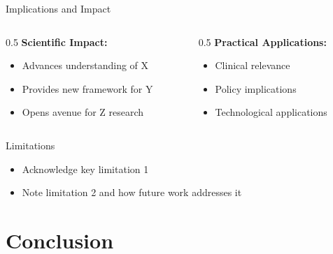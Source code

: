 \documentclass[aspectratio=169,11pt]{beamer}
\begin{document}
\begin{frame}{Implications and Impact}
  \begin{columns}[T]

    \begin{column}{0.5\textwidth}
      \textbf{Scientific Impact:}
      \begin{itemize}
        \item Advances understanding of X
        \item Provides new framework for Y
        \item Opens avenue for Z research
      \end{itemize}
    \end{column}

    \begin{column}{0.5\textwidth}
      \textbf{Practical Applications:}
      \begin{itemize}
        \item Clinical relevance
        \item Policy implications
        \item Technological applications
      \end{itemize}
    \end{column}

  \end{columns}

  \vspace{0.5cm}

  \begin{block}{Limitations}
    \begin{itemize}
      \item Acknowledge key limitation 1
      \item Note limitation 2 and how future work addresses it
    \end{itemize}
  \end{block}
\end{frame}


\section{Conclusion}
\end{document}
